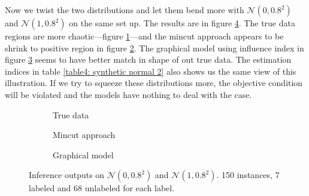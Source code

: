 \begin{table}[ht!]
	\centering
	\captionsetup{justification=centering}
	\caption{Measurement of inferences on $\mathcal{N}(0, 0.6^2)$ and $\mathcal{N}(1, 0.6^2)$.}
	\label{table4: synthetic normal 1}
\end{table}

Now we twist the two distributions and let them bend more with $\mathcal{N}(0, 0.8^2)$ and $\mathcal{N}(1, 0.8^2)$ on the same set up. The results are in figure \ref{fig4: synthetic data: normal distribution 2}. The true data regions are more chaotic---figure \ref{fig4a: synthetic data: normal distribution 2}---and the mincut approach appears to be shrink to positive region in figure \ref{fig4b: synthetic data: normal distribution 2}. The graphical model using influence index in figure \ref{fig4c: synthetic data: normal distribution 2} seems to have better match in shape of out true data. The estimation indices in table \ref{table4: synthetic normal 2} also shows us the same view of this illustration. If we try to squeeze these distributions more, the objective condition will be violated and the models have nothing to deal with the case.

\begin{figure}[ht!]
	\centering
	\captionsetup[subfigure]{justification=centering}
	\begin{subfigure}[b]{0.31\textwidth}
		\centering
		
		\caption{True data}
		\label{fig4a: synthetic data: normal distribution 2}
	\end{subfigure}
	\hfill
	\begin{subfigure}[b]{0.31\textwidth}
		\centering
		
		\caption{Mincut approach}
		\label{fig4b: synthetic data: normal distribution 2}
	\end{subfigure}
	\hfill
	\begin{subfigure}[b]{0.31\textwidth}
		\centering
		
		\caption{Graphical model}
		\label{fig4c: synthetic data: normal distribution 2}
	\end{subfigure}
	\caption[Inference outputs on $\mathcal{N}(0, 0.8^2)$ and $\mathcal{N}(1, 0.8^2)$.]{Inference outputs on $\mathcal{N}(0, 0.8^2)$ and $\mathcal{N}(1, 0.8^2)$. 150 instances, 7 labeled and 68 unlabeled for each label.}
	\label{fig4: synthetic data: normal distribution 2}
\end{figure}

